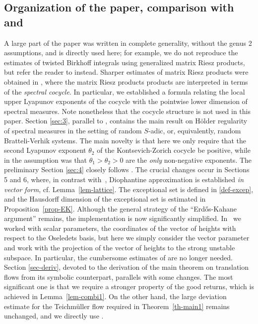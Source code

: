 \documentclass[11pt]{article}
\newcommand{\cf}{cf.\xspace}
\numberwithin{equation}{section}\newcommand{\Relation}[2][]{}\newtheorem*{prop*}{Proposition}
\theoremstyle{plain}
\theoremstyle{definition}
\begin{document}
\subsection{Organization of the paper, comparison with \cite{BuSo18a} and \cite{BuSo19}} A large part of the paper \cite{BuSo18a} was written in complete generality, without the genus 2 assumptions, and is directly used here; for
example, we do not reproduce the estimates of twisted Birkhoff integrals using generalized matrix Riesz products, but refer the reader to \cite[\S3]{BuSo18a} instead.
Sharper estimates of matrix Riesz products were obtained in \cite{BuSo19}, where the matrix Riesz products products are interpreted in terms of the \emph{spectral cocycle}. In particular, we established a formula relating the local upper Lyapunov exponents of the cocycle with the pointwise lower dimension of spectral measures. Note nonetheless that the cocycle structure is not used in this paper.
Section \ref{sec:3}, parallel to \cite[\S4]{BuSo18a}, contains the main result on Hölder regularity of spectral measures in the setting of random $S$-adic, or, equivalently, random Bratteli-Verhik systems.
The main novelty is that here we only require that the second Lyapunov exponent $\theta_2$ of the
Kontsevich-Zorich cocycle be positive, while in \cite{BuSo18a} the assumption was that $\theta_1 > \theta_2 >0$ are the \emph{only} non-negative exponents.
The preliminary Section \ref{sec:4} closely follows \cite{BuSo18a}.
The crucial changes occur in Sections 5 and 6, where, in contrast with~\cite{BuSo18a}, Diophantine approximation is established {\it in vector form}, \cf Lemma~\ref{lem-lattice}. The exceptional set is defined in \eqref{def-excep}, and the Hausdorff dimension of the exceptional set is estimated in Proposition~\ref{prop-EK}. Although the general strategy of the ``Erd\H{o}s-Kahane argu\-ment'' remains, the implementation is now significantly simplified. In~\cite{BuSo18a} we worked with scalar parameters, the coordinates of the vector of heights with respect to the \hbox{Oseledets} \hbox{basis}, but here we simply consider the vector parameter and work with the projection of the vector of heights to the strong unstable subspace.
In particular, the cumbersome estimates of \cite[\S8]{BuSo18a} are no longer needed.
Section \ref{sec-deriv}, devoted to the derivation of the main theorem on translation flows from its symbolic counterpart, parallels \cite[\S11]{BuSo18a} with some changes. The most significant one is that we require a stronger property of the good returns, which is achieved in Lemma~\ref{lem-combi1}. On the other hand, the large deviation estimate for the Teichmüller flow required in Theorem~\ref{th-main1} remains unchanged, and we directly use \cite[Prop.\,11.3]{BuSo18a}.\enlargethispage{.5\baselineskip}%
\end{document}
